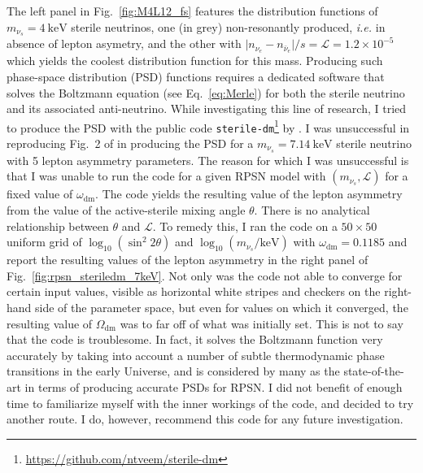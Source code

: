 The left panel in Fig.~\ref{fig:M4L12_fs} features the distribution functions of $m_{\nu_s} = 4~\mathrm{keV}$ sterile neutrinos, one (in grey) non-resonantly produced, \textit{i.e.} in absence of lepton asymetry, and the other with $\vert n_{\nu_e} - n_{\bar{\nu}_e} \vert / s = \mathcal{L} = 1.2 \times 10^{-5}$ which yields the coolest distribution function for this mass. Producing such phase-space distribution (PSD) functions requires a dedicated software that solves the Boltzmann equation (see Eq.~\ref{eq:Merle}) for both the sterile neutrino and its associated anti-neutrino. While investigating this line of research, I tried to produce the PSD with the public code \texttt{sterile-dm}\footnote{\url{https://github.com/ntveem/sterile-dm}} by \cite{sterile-dm}. I was unsuccessful in reproducing Fig.~2 of \cite{Abazajian2014} in producing the PSD for a $m_{\nu_s} = 7.14~ \mathrm{keV}$ sterile neutrino with 5 lepton asymmetry parameters. The reason for which I was unsuccessful is that I was unable to run the code for a given RPSN model with $\left( m_{\nu_s}, \mathcal{L} \right)$ for a fixed value of $\omega_{\mathrm{dm}}$. The code yields the resulting value of the lepton asymmetry from the value of the active-sterile mixing angle $\theta$. There is no analytical relationship between $\theta$ and $\mathcal{L}$. To remedy this, I ran the code on a $50 \times 50$ uniform grid of $\log_{10} \left( \sin^2 2 \theta \right)$ and $\log_{10} \left( m_{\nu_s} / \mathrm{keV} \right)$ with $\omega_{\mathrm{dm}} = 0.1185$ and report the resulting values of the lepton asymmetry in the right panel of Fig.~\ref{fig:rpsn_steriledm_7keV}. Not only was the code not able to converge for certain input values, visible as horizontal white stripes and checkers on the right-hand side of the parameter space, but even for values on which it converged, the resulting value of $\Omega_{\mathrm{dm}}$ was to far off of what was initially set. This is not to say that the code is troublesome. In fact, it solves the Boltzmann function very accurately by taking into account a number of subtle thermodynamic phase transitions in the early Universe, and is considered by many as the state-of-the-art in terms of producing accurate PSDs for RPSN. I did not benefit of enough time to familiarize myself with the inner workings of the code, and decided to try another route. I do, however, recommend this code for any future investigation. \\


